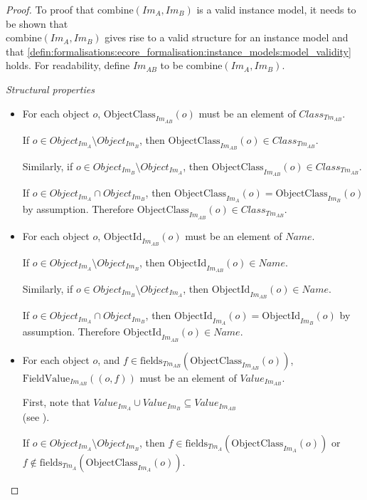 \begin{proof}
To proof that $\mathrm{combine}(Im_A, Im_B)$ is a valid instance model, it needs to be shown that\\ $\mathrm{combine}(Im_A, Im_B)$ gives rise to a valid structure for an instance model and that \cref{defin:formalisations:ecore_formalisation:instance_models:model_validity} holds. For readability, define $Im_{AB}$ to be $\mathrm{combine}(Im_A, Im_B)$.

\emph{Structural properties}
\begin{itemize}
    \item For each object $o$, $\mathrm{ObjectClass}_{Im_{AB}}(o)$ must be an element of $Class_{Tm_{AB}}$.

    If $o \in Object_{Im_A} \setminus Object_{Im_B}$, then $\mathrm{ObjectClass}_{Im_{AB}}(o) \in Class_{Tm_{AB}}$.
    
    Similarly, if $o \in Object_{Im_B} \setminus Object_{Im_A}$, then $\mathrm{ObjectClass}_{Im_{AB}}(o) \in Class_{Tm_{AB}}$.
    
    If $o \in Object_{Im_A} \cap Object_{Im_B}$, then $\mathrm{ObjectClass}_{Im_{A}}(o) = \mathrm{ObjectClass}_{Im_{B}}(o)$ by assumption. Therefore $\mathrm{ObjectClass}_{Im_{AB}}(o) \in Class_{Tm_{AB}}$.


    \item For each object $o$, $\mathrm{ObjectId}_{Im_{AB}}(o)$ must be an element of $Name$.
    
    If $o \in Object_{Im_A} \setminus Object_{Im_B}$, then $\mathrm{ObjectId}_{Im_{AB}}(o) \in Name$.
    
    Similarly, if $o \in Object_{Im_B} \setminus Object_{Im_A}$, then $\mathrm{ObjectId}_{Im_{AB}}(o) \in Name$.
    
    If $o \in Object_{Im_A} \cap Object_{Im_B}$, then $\mathrm{ObjectId}_{Im_{A}}(o) = \mathrm{ObjectId}_{Im_{B}}(o)$ by assumption. Therefore $\mathrm{ObjectId}_{Im_{AB}}(o) \in Name$.
    
    
    \item For each object $o$, and $f \in \mathrm{fields}_{Tm_{AB}}(\mathrm{ObjectClass}_{Im_{AB}}(o))$, $\mathrm{FieldValue}_{Im_{AB}}(( o, f ))$ must be an element of $Value_{Im_{AB}}$.
    
    First, note that $Value_{Im_A} \cup Value_{Im_B} \subseteq Value_{Im_{AB}}$\\(see ).
    
    If $o \in Object_{Im_A} \setminus Object_{Im_B}$, then $f \in \mathrm{fields}_{Tm_{A}}(\mathrm{ObjectClass}_{Im_{A}}(o))$ or \\$f \not\in \mathrm{fields}_{Tm_{A}}(\mathrm{ObjectClass}_{Im_{A}}(o))$.
    

\end{itemize}
\end{proof}
